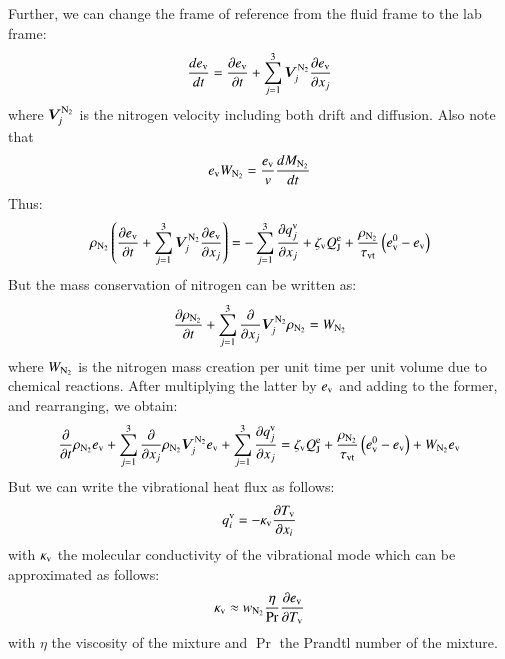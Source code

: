 \documentclass{warpdoc}
\newcommand{\mfd}{\displaystyle}
\newcommand{\ev}{{e_{\rm v}}}
\newcommand{\evzero}{{e_{\rm v}^0}}
\newcommand{\kappaev}{\kappa_{{\rm v}}}
\newcommand{\visc}{\eta}
\newcommand{\tauvt}{\tau_{\rm vt}}
\renewcommand{\vec}[1]{\bm{#1}}
\begin{document}
Further, we can change the frame of reference from the fluid frame to the lab frame:
%
\begin{equation}
\frac{d \ev}{d t}= \frac{\partial \ev}{\partial t} + \sum_{j=1}^3 \vec{V}_j^{\rm N_2} \frac{\partial \ev}{\partial x_j} 
\end{equation}
% 
where $\vec{V}_j^{\rm N_2}$ is the nitrogen velocity including both drift and diffusion. Also note that
%
\begin{equation}
 \ev W_{\rm N_2} = \frac{\ev}{v} \frac{d M_{\rm N_2}}{dt}
\end{equation}
%
Thus:
%
\begin{equation}
  \rho_{\rm N_2} \left(\frac{\partial \ev}{\partial t} + \sum_{j=1}^3 \vec{V}_j^{\rm N_2} \frac{\partial \ev}{\partial x_j}\right) = -\sum_{j=1}^{3}\frac{\partial q_j^{\rm v}}{\partial x_j}
+\zeta_{\rm v} Q_{\rm J}^{\rm e}   + {\frac{\rho_{\rm N_2}}{\tauvt}}\left( \evzero-\ev \right) 
\end{equation}
%
But the mass conservation of nitrogen can be written as:
%
\begin{equation}
\frac{\partial \rho_{\rm N_2}}{\partial t} + \sum_{j=1}^3  \frac{\partial }{\partial x_j}\vec{V}_j^{\rm N_2}\rho_{\rm N_2}= W_{\rm N_2}
\end{equation}
%
where $W_{\rm N_2}$ is the nitrogen mass creation per unit time per unit volume due to chemical reactions. After multiplying the latter by $\ev$ and adding to the former, and rearranging, we obtain: 
%
\begin{equation}
 \begin{array}{r}
  \mfd\frac{\partial}{\partial t} \rho_{\rm N_2} \ev
     + \sum_{j=1}^{3} \frac{\partial }{\partial x_j}
       \rho_{\rm N_2} \vec{V}_j^{\rm N_2} \ev
     + \sum_{j=1}^{3} \frac{\partial q_j^{\rm v}}{\partial x_j} 
 = 
 \zeta_{\rm v} Q_{\rm J}^{\rm e}   + {\frac{\rho_{\rm N_2}}{\tauvt}}\left( \evzero-\ev \right) + W_{\rm N_2} \ev
\end{array}
\label{eqn:ev1}
\end{equation}
%
But we can write the vibrational heat flux as follows:
%
\begin{equation}
 q^{\rm v}_i=-  \kappaev \frac{\partial T_{\rm v}}{\partial x_i}
\end{equation}
%
with $\kappaev$ the molecular  conductivity of the vibrational mode which can be approximated as follows:
%
\begin{equation}
 \kappaev\approx w_{\rm N_2} \frac{\visc}{\Pr}\frac{\partial \ev}{\partial T_{\rm v}}
\end{equation}
%
with $\visc$ the viscosity of the mixture and $\Pr$ the Prandtl number of the mixture.
\end{document}
